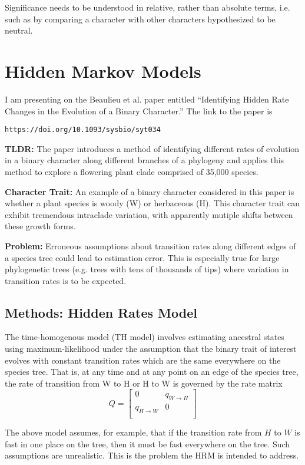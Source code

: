 \documentclass{article}
\begin{document}
Significance needs to be understood in relative, rather than absolute terms,
i.e. such as by comparing a character with other characters hypothesized to be neutral. 


\section{Hidden Markov Models}

I am presenting on the Beaulieu et al. paper entitled ``Identifying Hidden Rate
Changes in the Evolution of a Binary Character.'' The link to the paper is
\begin{verbatim}
https://doi.org/10.1093/sysbio/syt034
\end{verbatim}
\textbf{TLDR:} The paper introduces a method of identifying different rates of
evolution in a binary character along different branches of a phylogeny and
applies this method to explore a flowering plant clade comprised of 35,000
species.

\textbf{Character Trait:} An example of a binary character considered in this
paper is whether a plant species is woody (W) or herbaceous (H). This character
trait can exhibit tremendous intraclade variation, with apparently mutiple
shifts between these growth forms.

\textbf{Problem:} Erroneous assumptions about transition rates along different
edges of a species tree could lead to estimation error. This is especially true
for large phylogenetic trees (e.g. trees with tens of thousands of tips) where
variation in transition rates is to be expected.

\subsection{Methods: Hidden Rates Model}

\begin{definition}
  The time-homogenous model (TH model) involves estimating ancestral states
  using maximum-likelihood under the assumption that the binary trait of
  interest evolves with constant transition rates which are the same everywhere
  on the species tree. That is, at any time and at any point on an edge of the
  species tree, the rate of transition from W to H or H to W is governed by the
  rate matrix
  \begin{equation*}
    Q =
    \begin{bmatrix}
      0&q_{W\to H}\\
      q_{H\to W}&0\\
    \end{bmatrix}
  \end{equation*}
\end{definition}
\begin{remark}
  The above model assumes, for example, that if the transition rate from $H$ to
  $W$ is fast in one place on the tree, then it must be fast everywhere on the
  tree. Such assumptions are unrealistic. This is the problem the HRM is
  intended to address.
\end{remark}
\end{document}
